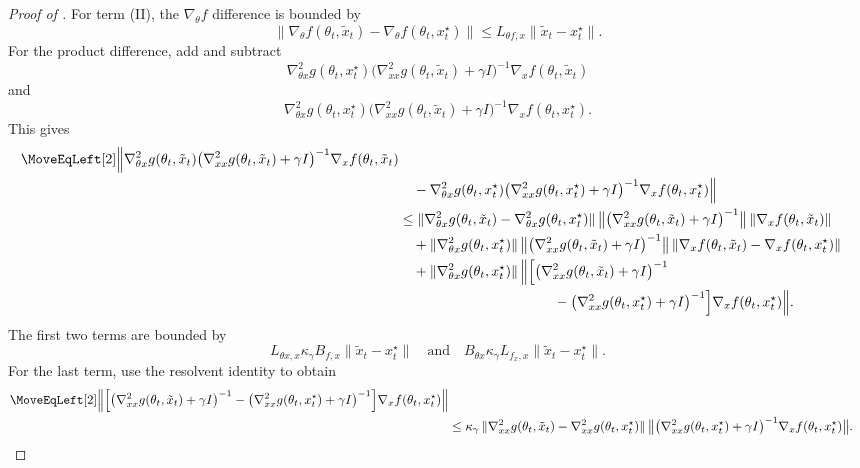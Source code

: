 \documentclass{article}
\theoremstyle{normaltheorem}
\begin{document}
\begin{proof}[Proof of ]
For term (II), the \(\nabla_\theta f\) difference is bounded by
\[
\|\nabla_\theta f(\theta_t,\tilde x_t)-\nabla_\theta f(\theta_t,x_t^\star)\|
\le L_{\theta f,x}\|\tilde x_t-x_t^\star\|.
\]
For the product difference, add and subtract
\[
\nabla^2_{\theta x}g(\theta_t,x_t^\star)
\big(\nabla^2_{xx}g(\theta_t,\tilde x_t)+\gamma I\big)^{-1}
\nabla_x f(\theta_t,\tilde x_t)
\]
and
\[
\nabla^2_{\theta x}g(\theta_t,x_t^\star)
\big(\nabla^2_{xx}g(\theta_t,\tilde x_t)+\gamma I\big)^{-1}
\nabla_x f(\theta_t,x_t^\star).
\]
This gives
\[
\begin{aligned}
\MoveEqLeft[2]\Big\|
\nabla^2_{\theta x}g(\theta_t,\tilde x_t)
\big(\nabla^2_{xx}g(\theta_t,\tilde x_t)+\gamma I\big)^{-1}
\nabla_x f(\theta_t,\tilde x_t)\\
&\quad-
\nabla^2_{\theta x}g(\theta_t,x_t^\star)
\big(\nabla^2_{xx}g(\theta_t,x_t^\star)+\gamma I\big)^{-1}
\nabla_x f(\theta_t,x_t^\star)
\Big\|\\
&\le
\|\nabla^2_{\theta x}g(\theta_t,\tilde x_t)-\nabla^2_{\theta x}g(\theta_t,x_t^\star)\|\,
\big\|\big(\nabla^2_{xx}g(\theta_t,\tilde x_t)+\gamma I\big)^{-1}\big\|\,
\|\nabla_x f(\theta_t,\tilde x_t)\|\\
&\quad+
\|\nabla^2_{\theta x}g(\theta_t,x_t^\star)\|\,
\big\|\big(\nabla^2_{xx}g(\theta_t,\tilde x_t)+\gamma I\big)^{-1}\big\|\,
\|\nabla_x f(\theta_t,\tilde x_t)-\nabla_x f(\theta_t,x_t^\star)\|\\
&\quad+
\|\nabla^2_{\theta x}g(\theta_t,x_t^\star)\|\,
\Big\|
\Big[
\big(\nabla^2_{xx}g(\theta_t,\tilde x_t)+\gamma I\big)^{-1}\\
&\hspace{39mm}
-\big(\nabla^2_{xx}g(\theta_t,x_t^\star)+\gamma I\big)^{-1}
\Big]\nabla_x f(\theta_t,x_t^\star)
\Big\|.
\end{aligned}
\]
The first two terms are bounded by
\[
L_{\theta x,x}\kappa_\gamma B_{f,x}\|\tilde x_t-x_t^\star\|
\quad\text{and}\quad
B_{\theta x}\kappa_\gamma L_{f_x,x}\|\tilde x_t-x_t^\star\|.
\]
For the last term, use the resolvent identity to obtain
\[
\begin{aligned}
\MoveEqLeft[2]\Big\|
\Big[
\big(\nabla^2_{xx}g(\theta_t,\tilde x_t)+\gamma I\big)^{-1}
-\big(\nabla^2_{xx}g(\theta_t,x_t^\star)+\gamma I\big)^{-1}
\Big]\nabla_x f(\theta_t,x_t^\star)
\Big\|\\
&\le
\kappa_\gamma\,
\|\nabla^2_{xx}g(\theta_t,\tilde x_t)-\nabla^2_{xx}g(\theta_t,x_t^\star)\|\,
\big\|\big(\nabla^2_{xx}g(\theta_t,x_t^\star)+\gamma I\big)^{-1}
\nabla_x f(\theta_t,x_t^\star)\big\|.
\end{aligned}
\]
\end{proof}
\end{document}
